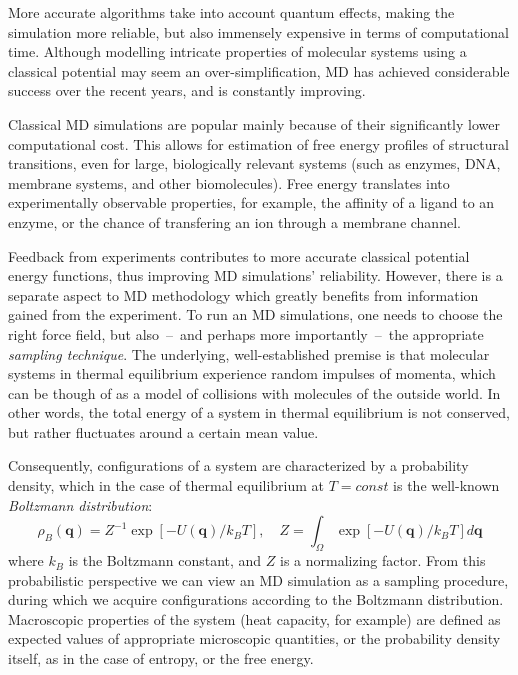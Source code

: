 More accurate algorithms take into account quantum effects, making the simulation more reliable, but also immensely expensive in terms of computational time.
Although modelling intricate properties of molecular systems using a classical potential may seem an over-simplification, MD has achieved considerable success over the recent years, and is constantly improving.

Classical MD simulations are popular mainly because of their significantly lower computational cost.
This allows for estimation of free energy profiles of structural transitions, even for large, biologically relevant systems (such as enzymes, DNA, membrane systems, and other biomolecules).
Free energy translates into experimentally observable properties, for example, the affinity of a ligand to an enzyme, or the chance of transfering an ion through a membrane channel.

Feedback from experiments contributes to more accurate classical potential energy functions, thus improving MD simulations' reliability.
However, there is a separate aspect to MD methodology which greatly benefits from information gained from the experiment.
To run an MD simulations, one needs to choose the right force field, but also~--~and perhaps more importantly~--~the appropriate \emph{sampling technique}.
The underlying, well-established premise is that molecular systems in thermal equilibrium experience random impulses of momenta, which can be though of as a model of collisions with molecules of the outside world.
In other words, the total energy of a system in thermal equilibrium is not conserved, but rather fluctuates around a certain mean value.

Consequently, configurations of a system are characterized by a probability density, which in the case of thermal equilibrium at $T=const$ is the well-known \emph{Boltzmann distribution}:
\begin{equation}
 \rho_B(\mathbf{q})=Z^{-1} \exp[-U(\mathbf{q})/k_BT], \quad  Z=\int_\Omega \exp[-U(\mathbf{q})/k_BT] d\mathbf{q}
\end{equation}
where $k_B$ is the Boltzmann constant, and $Z$ is a normalizing factor.
From this probabilistic perspective we can view an MD simulation as a sampling procedure, during which we acquire configurations according to the Boltzmann distribution.
Macroscopic properties of the system (heat capacity, for example) are defined as expected values of appropriate microscopic quantities, or the probability density itself, as in the case of entropy, or the free energy.

